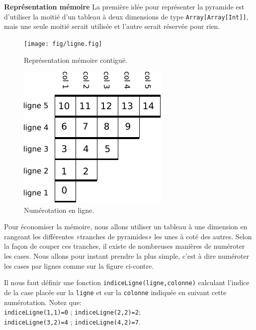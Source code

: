 \documentclass[10pt]{article}\usepackage[correction,nu]{esial}
\begin{document}
\begin{Exercice}\textbf{Représentation mémoire}
  \noindent La première idée pour représenter la pyramide est d'utiliser la
  moitié d'un tableau à deux dimensions de type \texttt{Array[Array[Int]]}, mais
  une seule moitié serait utilisée et l'autre serait réservée pour rien.
\end{Exercice}

\begin{figure}[h]
  \centering
  \texttt{[image: fig/ligne.fig]}\vspace{-.5\baselineskip}
  \caption{Représentation mémoire contiguë.}
  \label{fig:mem}%
\end{figure}

\begin{figure}
  \vspace{-1.2\baselineskip}
  \centerline{\includegraphics[scale=.9]{img/numerotation-ligne.pdf}}
  \vspace{-.5\baselineskip}
  \caption{Numérotation en ligne.}
  \label{fig:numligne}
  \vspace{-1.5\baselineskip}
  
\end{figure}

Pour économiser la mémoire, nous allons utiliser un tableau à une dimension en
rangeant les différentes «tranches de pyramides» les unes à coté des
autres. Selon la façon de couper ces tranches, il existe de nombreuses manières
de numéroter les cases. Nous allons pour instant prendre la plus simple, c'est à
dire numéroter les cases par lignes comme sur la figure ci-contre.

Il nous faut définir une fonction \texttt{indiceLigne(ligne,colonne)} calculant
l'indice de la case placée sur la \texttt{ligne} et sur la \texttt{colonne}
indiquée en suivant cette numérotation. Notez que:\\
\texttt{indiceLigne(1,1)=0} ; \texttt{indiceLigne(2,2)=2};\\
\texttt{indiceLigne(3,2)=4} ; \texttt{indiceLigne(4,2)=7}. 
\end{document}

